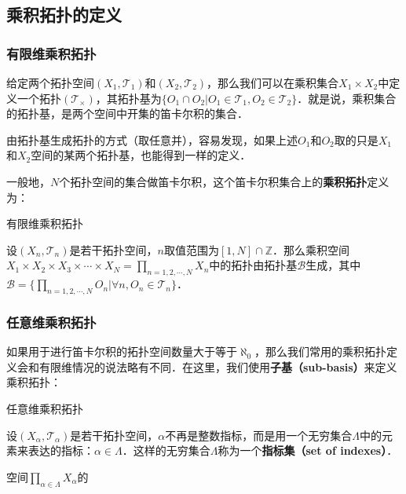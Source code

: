 
\subsection{乘积拓扑的定义}
\subsubsection{有限维乘积拓扑}

给定两个拓扑空间$(X_1, \mathcal{T}_1)$和$(X_2, \mathcal{T}_2)$，那么我们可以在乘积集合$X_1\times X_2$中定义一个拓扑$(\mathcal{T_\times})$，其拓扑基为$\{O_1\cap O_2|O_1\in\mathcal{T_1}, O_2\in\mathcal{T_2}\}$．就是说，乘积集合的拓扑基，是两个空间中开集的笛卡尔积的集合．

由拓扑基生成拓扑的方式（取任意并），容易发现，如果上述$O_1$和$O_2$取的只是$X_1$和$X_2$空间的某两个拓扑基，也能得到一样的定义．

一般地，$N$个拓扑空间的集合做笛卡尔积，这个笛卡尔积集合上的\textbf{乘积拓扑}定义为：

\begin{definition}{有限维乘积拓扑}

设$(X_n, \mathcal{T}_n)$是若干拓扑空间，$n$取值范围为$[1, N]\cap\mathbb{Z}$．那么乘积空间$X_1\times X_2\times X_3\times\cdots\times X_N=\prod\limits_{n=1,2,\cdots,N}X_n$中的拓扑由拓扑基$\mathcal{B}$生成，其中$\mathcal{B}=\{\prod\limits_{n=1,2,\cdots,N}O_n|\forall n, O_n\in\mathcal{T}_n\}$．

\end{definition}

\subsubsection{任意维乘积拓扑}

如果用于进行笛卡尔积的拓扑空间数量大于等于$\aleph_0$，那么我们常用的乘积拓扑定义会和有限维情况的说法略有不同．在这里，我们使用\textbf{子基（sub-basis）}来定义乘积拓扑：

\begin{definition}{任意维乘积拓扑}

设$(X_\alpha, \mathcal{T}_\alpha)$是若干拓扑空间，$\alpha$不再是整数指标，而是用一个无穷集合$\Lambda$中的元素来表达的指标：$\alpha\in\Lambda$．这样的无穷集合$\Lambda$称为一个\textbf{指标集（set of indexes）}．

空间$\prod\limits_{\alpha\in\Lambda}X_\alpha$的

\end{definition}


